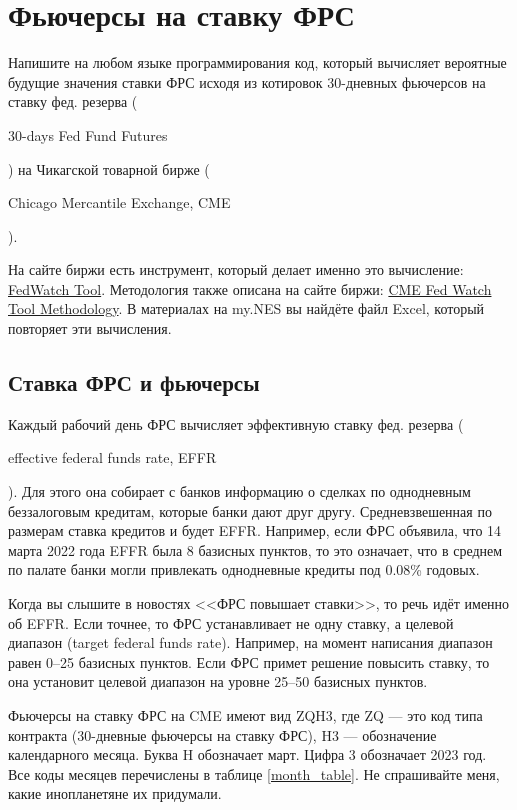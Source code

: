 \documentclass[a4paper,14pt]{extarticle}
\newcommand{\en}[1]{\begin{otherlanguage}{english}#1\end{otherlanguage}}
\begin{document}
\section*{Фьючерсы на ставку ФРС}

Напишите на любом языке программирования код, который вычисляет вероятные будущие значения ставки ФРС исходя из котировок 30-дневных фьючерсов на ставку фед. резерва (\en{30-days Fed Fund Futures}) на Чикагской товарной бирже (\en{Chicago Mercantile Exchange, CME}).

На сайте биржи есть инструмент, который делает именно это вычисление:
\href{https://www.cmegroup.com/trading/interest-rates/countdown-to-fomc.html}{FedWatch 
Tool}. Методология также описана на сайте биржи: \href{https://www.cmegroup.com/education/
demos-and-tutorials/fed-funds-futures-probability-tree-calculator.html}{CME Fed Watch Tool 
Methodology}. В материалах на my.NES вы найдёте файл Excel, который повторяет эти вычисления.

\subsection*{Ставка ФРС и фьючерсы}

Каждый рабочий день ФРС вычисляет эффективную ставку фед. резерва 
(\en{effective federal funds rate, EFFR}). Для этого она собирает с банков информацию о 
сделках по однодневным беззалоговым кредитам, которые банки дают друг другу. 
Средневзвешенная по размерам ставка кредитов и будет EFFR. 
Например, если ФРС объявила, что 14 марта 2022 года EFFR была
8 базисных пунктов, то это означает, что в среднем по палате банки могли привлекать 
однодневные кредиты под 0.08\% годовых.

Когда вы слышите в новостях <<ФРС повышает ставки>>, то речь идёт именно об EFFR. Если 
точнее, то ФРС устанавливает не одну ставку, а целевой диапазон (target federal funds 
rate). Например, на момент написания диапазон равен 0--25 базисных пунктов. Если ФРС 
примет решение повысить ставку, то она установит целевой диапазон на уровне 25--50 
базисных пунктов.

Фьючерсы на ставку ФРС на CME имеют вид ZQH3, где ZQ --- это 
код типа контракта (30-дневные фьючерсы на ставку ФРС), H3 --- обозначение календарного 
месяца. Буква H обозначает март. Цифра 3 обозначает 2023 год. Все коды месяцев 
перечислены в таблице \ref{month_table}. Не спрашивайте меня, какие инопланетяне их 
придумали.
\end{document}
